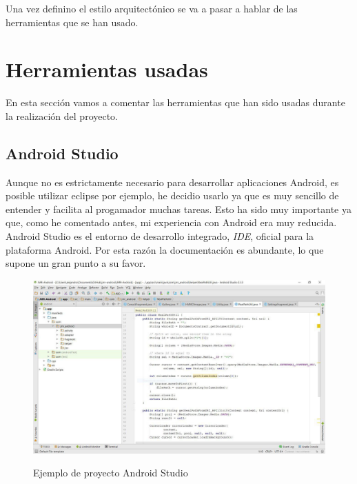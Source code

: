 Una vez definino el estilo arquitectónico se va a pasar a hablar de las herramientas que se han usado.

\section{Herramientas usadas}

En esta sección vamos a comentar las herramientas que han sido usadas durante la realización del proyecto.

\subsection{Android Studio}

Aunque no es estrictamente necesario para desarrollar aplicaciones Android, es posible utilizar eclipse por ejemplo, he decidio usarlo ya que es muy sencillo de entender y facilita al progamador muchas tareas. Esto ha sido muy importante ya que, como he comentado antes, mi experiencia con Android era muy reducida.\\

Android Studio es el entorno de desarrollo integrado, \textit{IDE}, oficial para la plataforma Android. Por esta razón la documentación es abundante, lo que supone un gran punto a su favor.\\

\begin{figure}[H] %
\centering
\includegraphics[scale=0.5]{imagenes/android-studio.jpg}  %
\label{android-studio.jpg}
\caption{Ejemplo de proyecto Android Studio}
\end{figure}

